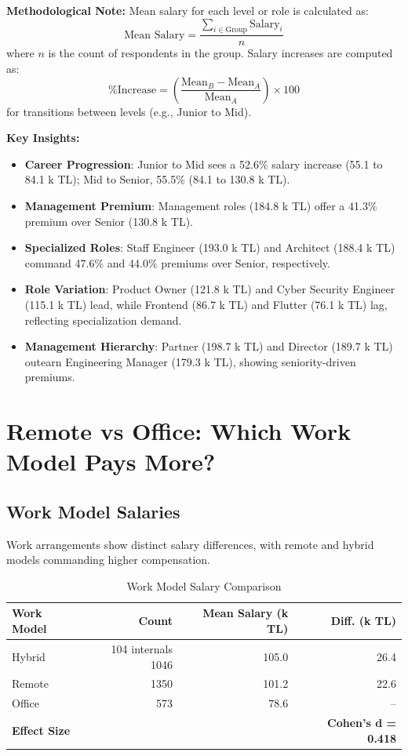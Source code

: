 \documentclass[12pt,a4paper]{article}
\begin{document}
\textbf{Methodological Note:}
Mean salary for each level or role is calculated as:
\[
	\text{Mean Salary} = \frac{\sum_{i \in \text{Group}} \text{Salary}_i}{n}
\]
where \( n \) is the count of respondents in the group. Salary increases are computed as:
\[
	\text{\% Increase} = \left( \frac{\text{Mean}_B - \text{Mean}_A}{\text{Mean}_A} \right) \times 100
\]
for transitions between levels (e.g., Junior to Mid).

\textbf{Key Insights:}
\begin{itemize}
	\item \textbf{Career Progression}: Junior to Mid sees a 52.6\% salary increase (55.1 to 84.1 k TL); Mid to Senior, 55.5\% (84.1 to 130.8 k TL).
	\item \textbf{Management Premium}: Management roles (184.8 k TL) offer a 41.3\% premium over Senior (130.8 k TL).
	\item \textbf{Specialized Roles}: Staff Engineer (193.0 k TL) and Architect (188.4 k TL) command 47.6\% and 44.0\% premiums over Senior, respectively.
	\item \textbf{Role Variation}: Product Owner (121.8 k TL) and Cyber Security Engineer (115.1 k TL) lead, while Frontend (86.7 k TL) and Flutter (76.1 k TL) lag, reflecting specialization demand.
	\item \textbf{Management Hierarchy}: Partner (198.7 k TL) and Director (189.7 k TL) outearn Engineering Manager (179.3 k TL), showing seniority-driven premiums.
\end{itemize}

\section{Remote vs Office: Which Work Model Pays More?}

\subsection{Work Model Salaries}
Work arrangements show distinct salary differences, with remote and hybrid models commanding higher compensation.

\begin{table}[H]
	\centering
	\small
	\begin{tabular}{lrrr}
		\toprule
		\textbf{Work Model}  & \textbf{Count} & \textbf{Mean Salary (k TL)} & \textbf{Diff. (k TL)}      \\
		\midrule
		Hybrid & 104 internals
		1046 & 105.0 & 26.4 \\
		Remote               & 1350           & 101.2                       & 22.6                       \\
		Office               & 573            & 78.6                        & --                         \\
		\midrule
		\textbf{Effect Size} &                &                             & \textbf{Cohen's d = 0.418} \\
		\bottomrule
	\end{tabular}
	\caption{Work Model Salary Comparison}
\end{table}
\end{document}
